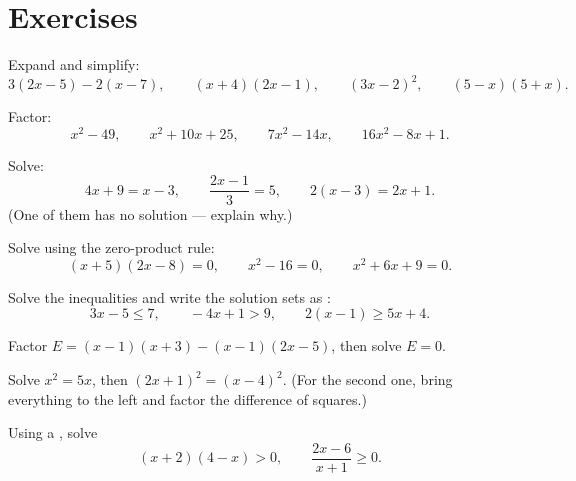 \section{Exercises}

\begin{exercise}[$\star$]\label{exo:g10:algebra:1}
Expand and simplify:
\[
3(2x - 5) - 2(x - 7), \qquad
(x + 4)(2x - 1), \qquad
(3x - 2)^2, \qquad
(5 - x)(5 + x).
\]
\end{exercise}

\begin{exercise}[$\star$]\label{exo:g10:algebra:2}
Factor:
\[
x^2 - 49, \qquad
x^2 + 10x + 25, \qquad
7x^2 - 14x, \qquad
16x^2 - 8x + 1 .
\]
\end{exercise}

\begin{exercise}[$\star$]\label{exo:g10:algebra:3}
Solve:
\[
4x + 9 = x - 3, \qquad
\frac{2x - 1}{3} = 5, \qquad
2(x - 3) = 2x + 1 .
\]
(One of them has no solution --- explain why.)
\end{exercise}

\begin{exercise}[$\star$]\label{exo:g10:algebra:4}
Solve using the zero-product rule:
\[
(x + 5)(2x - 8) = 0, \qquad
x^2 - 16 = 0, \qquad
x^2 + 6x + 9 = 0 .
\]
\end{exercise}

\begin{exercise}[$\star$]\label{exo:g10:algebra:5}
Solve the inequalities and write the solution sets as :
\[
3x - 5 \leq 7, \qquad
-4x + 1 > 9, \qquad
2(x - 1) \geq 5x + 4 .
\]
\end{exercise}

\begin{exercise}[$\star\star$]\label{exo:g10:algebra:6}
Factor $E = (x - 1)(x + 3) - (x - 1)(2x - 5)$, then solve $E = 0$.
\end{exercise}

\begin{exercise}[$\star\star$]\label{exo:g10:algebra:7}
Solve $x^2 = 5x$, then $(2x + 1)^2 = (x - 4)^2$. (For the second one,
bring everything to the left and factor the difference of squares.)
\end{exercise}

\begin{exercise}[$\star\star$]\label{exo:g10:algebra:8}
Using a , solve
\[
(x + 2)(4 - x) > 0,
\qquad
\frac{2x - 6}{x + 1} \geq 0 .
\]
\end{exercise}

